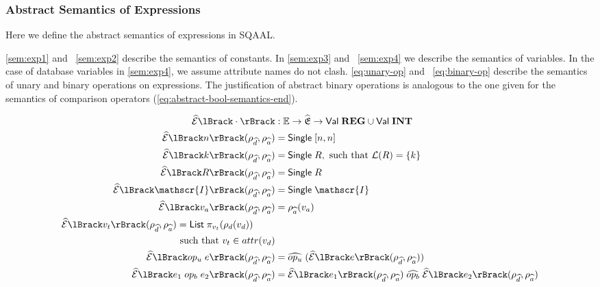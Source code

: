 \subsubsection{Abstract Semantics of Expressions}

Here we define the abstract semantics of expressions in SQAAL.

\autoref{sem:exp1} and ~\ref{sem:exp2} describe the semantics of constants.
In \autoref{sem:exp3} and ~\ref{sem:exp4} we describe the semantics of variables.
In the case of database variables in \autoref{sem:exp4}, we assume attribute names do not clash.
\autoref{eq:unary-op} and ~\ref{eq:binary-op} describe the semantics of unary and binary operations on expressions.
The justification of abstract binary operations is analogous to the one given for the semantics of comparison operators (\autoref{eq:abstract-bool-semantics-end}).

\begin{align}
    \absexpsem{\cdot} &: \mathbb{E} \rightarrow \ab{\mathfrak{E}} \rightarrow \mathsf{Val} \; \mathbf{REG} \cup \mathsf{Val} \; \mathbf{INT}\\
    \absexpsem{n}(\rho_{\ab{d}}, \rho_{\ab{a}}) &= \mathsf{Single} \; [n, n] \label{sem:exp1} \\
    \absexpsem{k}(\rho_{\ab{d}}, \rho_{\ab{a}}) &= \mathsf{Single} \; R,  \text{ such that }\mathcal{L}(R) = \{ k \} \label{sem:exp2} \\
    \absexpsem{R}(\rho_{\ab{d}}, \rho_{\ab{a}}) &= \mathsf{Single} \; R \\
    \absexpsem{\mathscr{I}}(\rho_{\ab{d}}, \rho_{\ab{a}}) &= \mathsf{Single} \; \mathscr{I} \\
    \absexpsem{v_a}(\rho_{\ab{d}}, \rho_{\ab{a}}) &=  \rho_{\ab{a}}(v_a) \label{sem:exp3} \\
    \begin{split}
        \absexpsem{v_t}(\rho_{\ab{d}}, \rho_{\ab{a}}) &=  \mathsf{List} \; \pi_{v_t}(\rho_d(v_d)) \\
        &\text{ such that } v_t \in attr(v_d) \label{sem:exp4}
    \end{split} \\
    \absexpsem{op_u \; e}(\rho_{\ab{d}}, \rho_{\ab{a}}) &= \ab{op_u} \; (\absexpsem{e}(\rho_{\ab{d}}, \rho_{\ab{a}})) \label{eq:unary-op} \\
    \absexpsem{e_1 \;op_b\; e_2}(\rho_{\ab{d}}, \rho_{\ab{a}}) &= \absexpsem{e_1}(\rho_{\ab{d}}, \rho_{\ab{a}}) \;\ab{op_b}\; \absexpsem{e_2}(\rho_{\ab{d}}, \rho_{\ab{a}}) \label{eq:binary-op}
\end{align}

